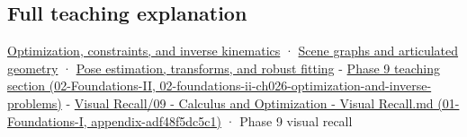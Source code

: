 \subsection{Full teaching explanation}\label{appendix-29f4bea4c2bb-full-teaching-explanation}

\hyperref[04-visual-computing-ii-ch029-optimization-constraints-and-inverse-kinematics]{Optimization, constraints, and inverse kinematics} · \hyperref[04-visual-computing-ii-ch029-scene-graphs-and-articulated-geometry]{Scene graphs and articulated geometry} · \hyperref[04-visual-computing-ii-ch032-pose-estimation-transforms-and-robust-fitting]{Pose estimation, transforms, and robust fitting} - \href{../02-Foundations-II/main.pdf\#nameddest=02-foundations-ii-ch026-optimization-and-inverse-problems}{Phase 9 teaching section (02-Foundations-II, 02-foundations-ii-ch026-optimization-and-inverse-problems)} - \href{../01-Foundations-I/main.pdf\#nameddest=appendix-adf48f5dc5c1}{Visual Recall/09 - Calculus and Optimization - Visual Recall.md (01-Foundations-I, appendix-adf48f5dc5c1)} · Phase 9 visual recall
